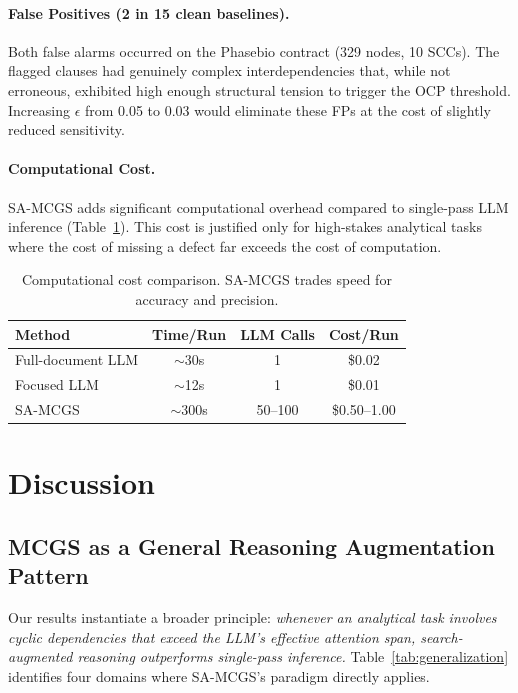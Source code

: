 \documentclass{article}
\begin{document}
\paragraph{False Positives (2 in 15 clean baselines).}
Both false alarms occurred on the Phasebio contract (329 nodes, 10 SCCs). The flagged clauses had genuinely complex interdependencies that, while not erroneous, exhibited high enough structural tension to trigger the OCP threshold. Increasing $\epsilon$ from 0.05 to 0.03 would eliminate these FPs at the cost of slightly reduced sensitivity.

\paragraph{Computational Cost.} SA-MCGS adds significant computational overhead compared to single-pass LLM inference (Table~\ref{tab:cost}). This cost is justified only for high-stakes analytical tasks where the cost of missing a defect far exceeds the cost of computation.

\begin{table}[t]
\caption{Computational cost comparison. SA-MCGS trades speed for accuracy and precision.}
\label{tab:cost}
\centering
\small
\begin{tabular}{lccc}
\toprule
\textbf{Method} & \textbf{Time/Run} & \textbf{LLM Calls} & \textbf{Cost/Run} \\
\midrule
Full-document LLM & $\sim$30s & 1 & \$0.02 \\
Focused LLM & $\sim$12s & 1 & \$0.01 \\
SA-MCGS & $\sim$300s & 50--100 & \$0.50--1.00 \\
\bottomrule
\end{tabular}
\end{table}

\section{Discussion}

\subsection{MCGS as a General Reasoning Augmentation Pattern}

Our results instantiate a broader principle: \emph{whenever an analytical task involves cyclic dependencies that exceed the LLM's effective attention span, search-augmented reasoning outperforms single-pass inference.} Table~\ref{tab:generalization} identifies four domains where SA-MCGS's paradigm directly applies.
\end{document}
